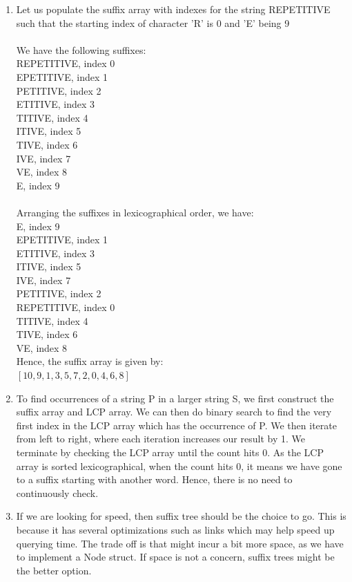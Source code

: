 \documentclass[12pt,letterpaper]{article}
\begin{document}
\begin{enumerate}
  \item
    Let us populate the suffix array with indexes for the string REPETITIVE such that the starting index of character 'R' is 0 and 'E' being 9 \\\\
    We have the following suffixes: \\
    REPETITIVE, index 0 \\
    EPETITIVE, index 1  \\
    PETITIVE, index 2  \\
    ETITIVE, index 3  \\
    TITIVE, index 4  \\
    ITIVE, index 5  \\
    TIVE, index 6  \\
    IVE, index 7 \\
    VE, index 8  \\
    E, index 9  \\\\
    Arranging the suffixes in lexicographical order, we have: \\
    E, index 9  \\
    EPETITIVE, index 1  \\
    ETITIVE, index 3  \\
    ITIVE, index 5  \\
    IVE, index 7 \\
    PETITIVE, index 2  \\
    REPETITIVE, index 0 \\
    TITIVE, index 4  \\
    TIVE, index 6  \\
    VE, index 8  \\

    Hence, the suffix array is given by: \\
    $[10, 9, 1, 3, 5, 7, 2, 0, 4, 6, 8]$
  \item
    To find occurrences of a string P in a larger string S, 
    we first construct the suffix array and LCP array.
    We can then do binary search to find the very first index in the LCP array which has the occurrence of P.
    We then iterate from left to right, where each iteration increases our result by 1. 
    We terminate by checking the LCP array until the count hits 0.
    As the LCP array is sorted lexicographical, when the count hits 0, 
    it means we have gone to a suffix starting with another word.
    Hence, there is no need to continuously check.
  \item 
    If we are looking for speed, then suffix tree should be the choice to go.
    This is because it has several optimizations such as links which may help speed up querying time.
    The trade off is that might incur a bit more space, as we have to implement a Node struct.
    If space is not a concern, suffix trees might be the better option.
\end{enumerate}
\end{document}
